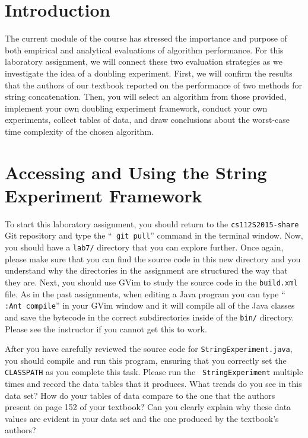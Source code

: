 


\usepackage[compact]{titlesec}


\section*{Introduction}

The current module of the course has stressed the importance and purpose of both empirical and analytical evaluations of
algorithm performance. For this laboratory assignment, we will connect these two evaluation strategies as we investigate
the idea of a doubling experiment. First, we will confirm the results that the authors of our textbook reported on the
performance of two methods for string concatenation. Then, you will select an algorithm from those provided, implement
your own doubling experiment framework, conduct your own experiments, collect tables of data, and draw conclusions about
the worst-case time complexity of the chosen algorithm.

\section*{Accessing and Using the String Experiment Framework}

To start this laboratory assignment, you should return to the {\tt cs112S2015-share} Git repository and type the ``{\tt
git pull}'' command in the terminal window.  Now, you should have a {\tt lab7/} directory that you can explore further.
Once again, please make sure that you can find the source code in this new directory and you understand why the
directories in the assignment are structured the way that they are. Next, you should use GVim to study the source code
in the {\tt build.xml} file.  As in the past assignments, when editing a Java program you can type ``{\tt
:Ant compile}'' in your GVim window and it will compile all of the Java classes and save the bytecode in the correct
subdirectories inside of the {\tt bin/} directory.  Please see the instructor if you cannot get this to work.

After you have carefully reviewed the source code for {\tt StringExperiment.java}, you should compile and run this
program, ensuring that you correctly set the {\tt CLASSPATH} as you complete this task. Please run the {\tt
StringExperiment} multiple times and record the data tables that it produces. What trends do you see in this data set?
How do your tables of data compare to the one that the authors present on page 152 of your textbook? Can you clearly
explain why these data values are evident in your data set and the one produced by the textbook's authors?

